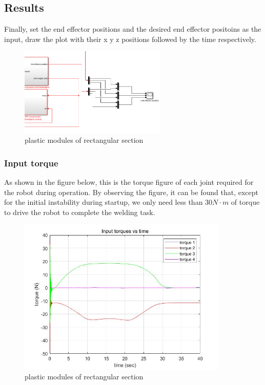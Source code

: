 \subsection{Results}

Finally, set the end effector positions and the desired end effector positoins as the input, draw the plot with their x y z positions followed by the time respectively.

\begin{figure}[htbp]
	\centering
	\includegraphics[width=7cm]{./fig/re.png}
	\caption{plastic modules of rectangular section}
	\label{F 5.9}
\end{figure}


\subsubsection*{Input torque}


As shown in the figure below, this is the torque figure of each joint required for the robot during operation. By observing the figure, it can be found that, except for the initial instability during startup, we only need less than $30N\cdot m$ of torque to drive the robot to complete the welding task.

\begin{figure}[htbp]
	\centering
	\includegraphics[width=10cm]{./fig/3.jpg}
	\caption{plastic modules of rectangular section}
	\label{F 5.10}
\end{figure}

